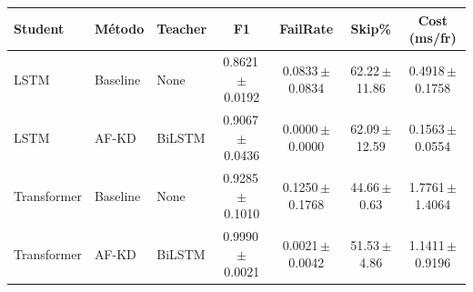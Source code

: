 \begin{tabular}{lllcccc}
\toprule
Student & Método & Teacher & F1 & FailRate & Skip\% & Cost (ms/fr) \\
\midrule
LSTM & Baseline & None & 0.8621\,{\tiny$\pm$0.0192} & 0.0833\,{\tiny$\pm$0.0834} & 62.22\,{\tiny$\pm$11.86} & 0.4918\,{\tiny$\pm$0.1758} \\
LSTM & AF-KD & BiLSTM & 0.9067\,{\tiny$\pm$0.0436} & 0.0000\,{\tiny$\pm$0.0000} & 62.09\,{\tiny$\pm$12.59} & 0.1563\,{\tiny$\pm$0.0554} \\
Transformer & Baseline & None & 0.9285\,{\tiny$\pm$0.1010} & 0.1250\,{\tiny$\pm$0.1768} & 44.66\,{\tiny$\pm$0.63} & 1.7761\,{\tiny$\pm$1.4064} \\
Transformer & AF-KD & BiLSTM & 0.9990\,{\tiny$\pm$0.0021} & 0.0021\,{\tiny$\pm$0.0042} & 51.53\,{\tiny$\pm$4.86} & 1.1411\,{\tiny$\pm$0.9196} \\
\bottomrule
\end{tabular}